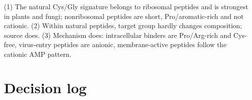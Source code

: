 \documentclass[11pt,a4paper]{article}
\begin{document}
\begin{keypoint}
(1) The natural Cys/Gly signature belongs to ribosomal peptides and is strongest in plants and fungi; nonribosomal peptides are short, Pro/aromatic-rich and not cationic.
(2) Within natural peptides, target group hardly changes composition; source does. (3) Mechanism does: intracellular binders are Pro/Arg-rich and Cys-free,
virus-entry peptides are anionic, membrane-active peptides follow the cationic AMP pattern.
\end{keypoint}

\section{Decision log}
\end{document}
